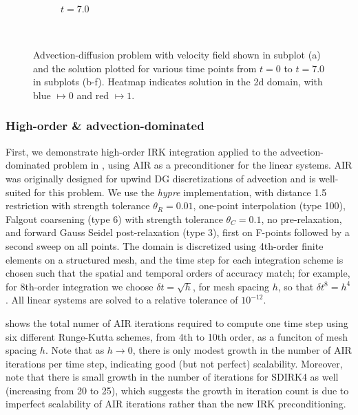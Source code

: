 \documentclass[review]{siamart}
\begin{document}
\begin{figure}[!htb]
\begin{subfigure}[b]{0.3\textwidth}
    \caption{$t = 7.0$}
  \end{subfigure}
  \\\vspace{2ex}
      \caption{Advection-diffusion problem with velocity field shown in
      subplot (a) and the solution plotted for various time points from
      $t=0$ to $t = 7.0$ in subplots (b-f). Heatmap indicates solution in the
      2d domain, with blue $\mapsto 0$ and red $\mapsto 1$.}
  \label{fig:ad_advdiff}
\end{figure}

\subsubsection{High-order \& advection-dominated}\label{sec:numerics_lin:dg:adv}

First, we demonstrate high-order IRK integration applied to the advection-dominated
problem in , using AIR as a preconditioner for the linear
systems. AIR was originally designed for upwind DG discretizations of advection
and is well-suited for this problem. We use the \textit{hypre} implementation,
with distance 1.5 restriction with strength tolerance $\theta_R=0.01$, one-point
interpolation (type 100), Falgout coarsening (type 6) with strength tolerance
$\theta_C=0.1$, no pre-relaxation, and forward Gauss Seidel
post-relaxation (type 3), first on F-points followed by a second sweep on
all points. The domain is discretized using 4th-order finite elements on a
structured mesh, and the time step for each integration scheme is chosen
such that the spatial and temporal orders of accuracy match; for example,
for 8th-order integration we choose $\delta t = \sqrt{h}$, for mesh spacing
$h$, so that $\delta t^8 = h^4$. All linear systems are solved to a relative
tolerance of $10^{-12}$.

 shows the total numer of AIR iterations required to
compute one time step using six different Runge-Kutta schemes, from 4th
to 10th order, as a funciton of mesh spacing $h$. Note that as $h\to 0$,
there is only modest growth in the number of AIR iterations per time step,
indicating good (but not perfect) scalability.
Moreover, note that there is small growth in the number of iterations for
SDIRK4 as well (increasing from 20 to 25), which suggests the growth in
iteration count is due to imperfect scalability of AIR iterations rather
than the new IRK preconditioning.
\end{document}
